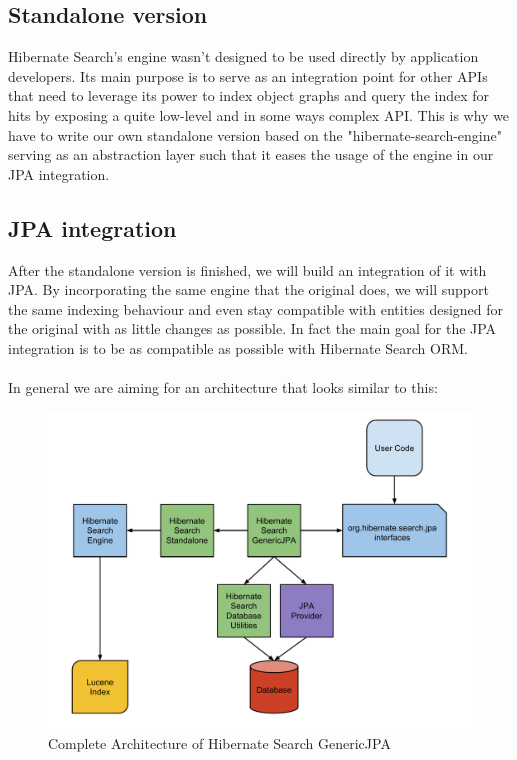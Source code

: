 \subsection{Standalone version} \label{problem_indexing_searching}
Hibernate Search's engine wasn't designed to be used directly by application developers. Its main purpose is to serve as an integration point for other APIs that need to leverage its power to index object graphs and query the index for hits by exposing a quite low-level and in some ways complex API. This is why we have to write our own standalone version based on the "hibernate-search-engine" serving as an abstraction layer such that it eases the usage of the engine in our JPA integration.

\subsection{JPA integration}
After the standalone version is finished, we will build an integration of it with JPA. By incorporating the same engine that the original does, we will support the same indexing behaviour and even stay compatible with entities designed for the original with as little changes as possible. In fact the main goal for the JPA integration is to be as compatible as possible with Hibernate Search ORM.
\\\\
In general we are aiming for an architecture that looks similar to this:

\begin{figure}[ht]
	\centering
	\includegraphics[scale=0.5]{images/hibernate_search_genericjpa_complete_architecture.pdf}
	\caption{Complete Architecture of Hibernate Search GenericJPA}
	\label{hibernate_search_genericjpa_complete_architecture}
\end{figure}

